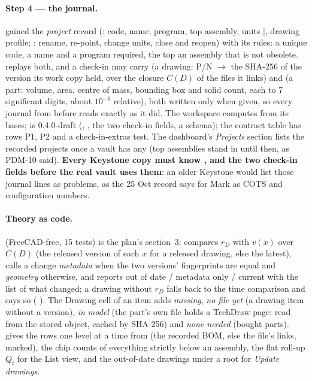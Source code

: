 \paragraph{Step 4 --- the journal.}  gained the \emph{project} record (: code,
name, program, top assembly, units |, drawing profile; : rename, re-point,
change units, close and reopen) with its rules: a unique code, a name and a program required, the top an assembly
that is not obsolete.  replays both, and a check-in may carry  (a drawing:
P/N $\rightarrow$ the SHA-256 of the version its work copy held, over the closure $C(D)$ of the files it links) and
 (a part: volume, area, centre of mass, bounding box and solid count, each to 7 significant
digits, about $10^{-6}$ relative), both written only when given, so every journal from before reads exactly as it
did. The workspace computes  from its  bases;  is
0.4.0-draft (, , the two check-in fields, a 
schema); the contract table has rows P1, P2 and a check-in-extras test. The dashboard's \emph{Projects} section
lists the recorded projects once a vault has any (top assemblies stand in until then, as PDM-10 said).
\textbf{Every Keystone copy must know ,  and the two check-in fields
before the real vault uses them}: an older Keystone would list those journal lines as problems, as the 25 Oct
record says for Mark as COTS and configuration numbers.

\paragraph{Theory as code.}  (FreeCAD-free, 15 tests) is the plan's
section~3:  compares $r_D$ with $v(x)$ over $C(D)$ (the released version of each $x$ for a
released drawing, else the latest), calls a change \emph{metadata} when the two versions' fingerprints are equal
and \emph{geometry} otherwise, and reports out of date / metadata only / current with the list of what changed;
a drawing without $r_D$ falls back to the time comparison and says so ( ). The Drawing
cell of an item adds \emph{missing}, \emph{no file yet} (a drawing item without a version), \emph{in model} (the
part's own file holds a TechDraw page: read from the stored object, cached by SHA-256) and \emph{none needed}
(bought parts).  gives the rows one level at a time from  (the recorded
BOM, else the file's links, marked), the chip counts of everything strictly below an assembly, the flat roll-up
$Q_t$ for the List view, and the out-of-date drawings under a root for \emph{Update drawings}.

